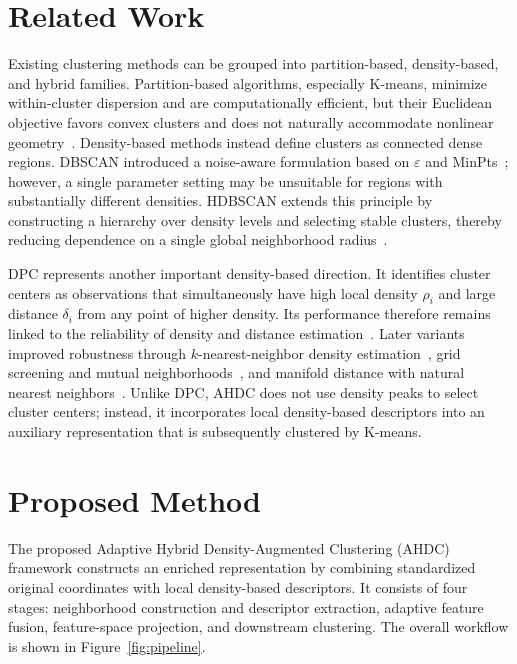 \documentclass[twoside]{article}
\begin{document}
\section{Related Work}
Existing clustering methods can be grouped into partition-based, density-based, and hybrid families. Partition-based algorithms, especially K-means, minimize within-cluster dispersion and are computationally efficient, but their Euclidean objective favors convex clusters and does not naturally accommodate nonlinear geometry~\cite{Jain2010}. Density-based methods instead define clusters as connected dense regions. DBSCAN introduced a noise-aware formulation based on $\varepsilon$ and MinPts~\cite{Ester1996}; however, a single parameter setting may be unsuitable for regions with substantially different densities. HDBSCAN extends this principle by constructing a hierarchy over density levels and selecting stable clusters, thereby reducing dependence on a single global neighborhood radius~\cite{Campello2015}.

DPC represents another important density-based direction. It identifies cluster centers as observations that simultaneously have high local density $\rho_i$ and large distance $\delta_i$ from any point of higher density. Its performance therefore remains linked to the reliability of density and distance estimation~\cite{Rodriguez2014}. Later variants improved robustness through $k$-nearest-neighbor density estimation~\cite{Du2016}, grid screening and mutual neighborhoods~\cite{Chen2022}, and manifold distance with natural nearest neighbors~\cite{Wang2025}. Unlike DPC, AHDC does not use density peaks to select cluster centers; instead, it incorporates local density-based descriptors into an auxiliary representation that is subsequently clustered by K-means.

\section{Proposed Method}
The proposed Adaptive Hybrid Density-Augmented Clustering (AHDC) framework constructs an enriched representation by combining standardized original coordinates with local density-based descriptors. It consists of four stages: neighborhood construction and descriptor extraction, adaptive feature fusion, feature-space projection, and downstream clustering. The overall workflow is shown in Figure~\ref{fig:pipeline}.
\end{document}
